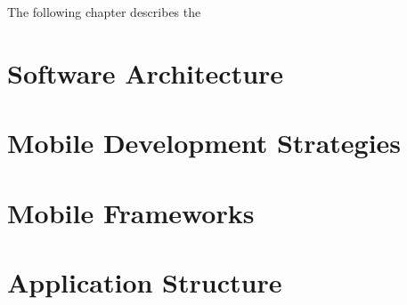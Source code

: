 The following chapter describes the

\section{Software Architecture}


\section{Mobile Development Strategies}


\section{Mobile Frameworks}


\section{Application Structure}


